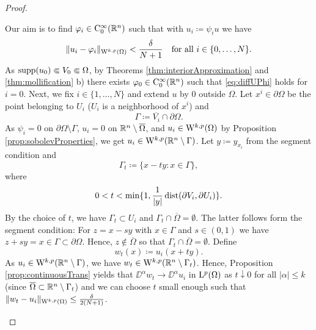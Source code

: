 \begin{proof}
\begin{enumerate}[i)]
      Our aim is to find $\varphi_i \in \mathrm{C}_0^\infty(\mathbb{R}^n)$ such that with $u_i \coloneqq \psi_i u$ we have
      \begin{equation} \label{eq:diffUPhi}
        \|u_i - \varphi_i\|_{\mathrm{W}^{k,p}(\Omega)} < \frac{\delta}{N + 1} \quad\text{for all } i \in \{0,\dots,N\}.        
      \end{equation}
      As $\operatorname{supp}(u_0) \Subset V_0 \Subset \Omega$, by Theorems \ref{thm:interiorApproximation} and \ref{thm:mollification} b) there exists $\varphi_0 \in \mathrm{C}_0^\infty(\mathbb{R}^n)$ such that \eqref{eq:diffUPhi} holds for $i = 0$.
      Next, we fix $i \in \{ 1, \dots, N\}$ and extend $u$ by $0$ outside $\Omega$.
      Let $x^i \in \partial \Omega$ be the point belonging to $U_i$ ($U_i$ is a neighborhood of $x^i$) and 
      $$
      \Gamma \coloneqq \overline{V_i} \cap \partial\Omega.
      $$
      As $\psi_i = 0$ on $\partial \Omega \setminus \Gamma$, $u_i = 0$ on $\mathbb{R}^n \setminus \overline{\Omega}$, and $u_i \in \mathrm{W}^{k,p}(\Omega)$ by Proposition \ref{prop:sobolevProperties}, we get $u_i \in \mathrm{W}^{k,p}(\mathbb{R}^n \setminus \Gamma)$.
      Let $y \coloneqq y_{x_i}$ from the segment condition and 
      $$
      \Gamma_t \coloneqq \{ x - ty \colon x \in \Gamma \},
      $$
      where 
      $$
      0 < t < \min\{1, \frac{1}{|y|} \operatorname{dist}(\partial V_i, \partial U_i)\}.
      $$
      By the choice of $t$, we have $\Gamma_t \subset U_i$ and $\Gamma_t \cap \overline{\Omega} = \emptyset$.
      The latter follows form the segment condition: For $z = x - sy$ with $x \in \Gamma$ and $s \in (0,1)$ we have $z + sy = x \in \Gamma \subset \partial\Omega$.
      Hence, $z \not\in\overline{\Omega}$ so that $\Gamma_t \cap \overline\Omega = \emptyset$.
      Define 
      $$
      w_t(x) \coloneqq u_i(x + ty).
      $$
      As $u_i \in \mathrm{W}^{k,p}(\mathbb{R}^n \setminus \Gamma)$, we have $w_t \in \mathrm{W}^{k,p}(\mathbb{R}^n\setminus \Gamma_t)$.
      Hence, Proposition \ref{prop:continuousTrans} yields that $\DD^\alpha w_t \to \DD^\alpha u_i$ in $\mathrm{L}^p(\Omega)$ as $t \downarrow 0$ for all $|\alpha| \leq k$ (since $\overline\Omega \subset \mathbb{R}^n \setminus \Gamma_t$) and we can choose $t$ small enough such that $\|w_t - u_i \|_{\mathrm{W}^{k,p}(\Omega)} \leq \frac{\delta}{2 ( N + 1 )}$.


\end{enumerate}
\end{proof}
